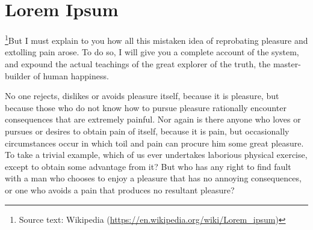 \documentclass[twoside]{article} %
\begin{document}
\section{Lorem Ipsum}
\footnote{Source text: Wikipedia (\url{https://en.wikipedia.org/wiki/Lorem_ipsum})}But I must explain to you how all this mistaken idea of reprobating pleasure and extolling pain arose. To do so, I will give you a complete account of the system, and expound the actual teachings of the great explorer of the truth, the master-builder of human happiness. 
\ifshowmarginnotes
{}
\else
\fi

No one rejects, dislikes or avoids pleasure itself, because it is pleasure, but because those who do not know how to pursue pleasure rationally encounter consequences that are extremely painful. Nor again is there anyone who loves or pursues or desires to obtain pain of itself, because it is pain, but occasionally circumstances occur in which toil and pain can procure him some great pleasure.  
\ifshowmarginnotes
{} 
\else
\fi
To take a trivial example, which of us ever undertakes laborious physical exercise, except to obtain some advantage from it? But who has any right to find fault with a man who chooses to enjoy a pleasure that has no annoying consequences, or one who avoids a pain that produces no resultant pleasure? 
\end{document}
